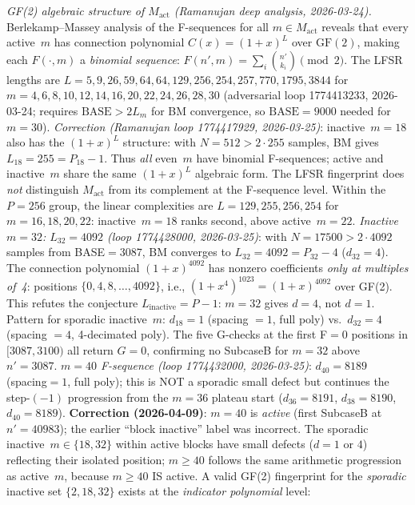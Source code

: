 \documentclass[11pt]{article}
\theoremstyle{plain}
\theoremstyle{definition}
\begin{document}
\emph{GF(2) algebraic structure of $M_{\mathrm{act}}$ (Ramanujan deep analysis, 2026-03-24).}
Berlekamp--Massey analysis of the F-sequences for all $m\in M_{\mathrm{act}}$ reveals
that every active~$m$ has connection polynomial $C(x) = (1+x)^L$ over $\mathrm{GF}(2)$,
making each $F(\cdot,m)$ a \emph{binomial sequence}: $F(n',m) = \sum_{i} \binom{n'}{k_i} \pmod{2}$.
The LFSR lengths are $L=5,9,26,59,64,64,129,256,254,257,770,1795,3844$ for
$m=4,6,8,10,12,14,16,20,22,24,26,28,30$ (adversarial loop 1774413233, 2026-03-24;
requires $\mathrm{BASE} > 2L_m$ for BM convergence, so $\mathrm{BASE}=9000$ needed for $m=30$).
\emph{Correction (Ramanujan loop 1774417929, 2026-03-25)}: inactive~$m=18$ also
has the $(1+x)^L$ structure: with $N=512>2\cdot 255$ samples, BM gives $L_{18}=255=P_{18}-1$.
Thus \emph{all} even~$m$ have binomial F-sequences; active and inactive~$m$ share
the same $(1+x)^L$ algebraic form.  The LFSR fingerprint does \emph{not} distinguish
$M_{\mathrm{act}}$ from its complement at the F-sequence level.
Within the $P=256$ group, the linear complexities are $L=129,255,256,254$ for $m=16,18,20,22$:
inactive~$m=18$ ranks second, above active~$m=22$.
\emph{Inactive $m=32$: $L_{32}=4092$ (loop 1774428000, 2026-03-25)}: with $N=17500>2\cdot 4092$
samples from BASE$=3087$, BM converges to $L_{32}=4092=P_{32}-4$ ($d_{32}=4$).
The connection polynomial $(1{+}x)^{4092}$ has nonzero coefficients \emph{only at multiples of~4}:
positions $\{0,4,8,\ldots,4092\}$, i.e., $(1{+}x^4)^{1023}=(1{+}x)^{4092}$ over GF(2).
This refutes the conjecture $L_{\mathrm{inactive}}=P-1$: $m=32$ gives $d=4$, not $d=1$.
Pattern for sporadic inactive~$m$: $d_{18}=1$ (spacing $=1$, full poly) vs.\
$d_{32}=4$ (spacing $=4$, 4-decimated poly). The five G-checks at the first
F$=0$ positions in $[3087, 3100)$ all return $G=0$, confirming no SubcaseB
for $m=32$ above $n'=3087$.
\emph{$m=40$ F-sequence (loop 1774432000, 2026-03-25)}: $d_{40}=8189$ (spacing$=1$, full poly);
this is NOT a sporadic small defect but continues the step-$(-1)$ progression from the
$m=36$ plateau start ($d_{36}=8191$, $d_{38}=8190$, $d_{40}=8189$).
\textbf{Correction (2026-04-09)}: $m=40$ is \emph{active} (first SubcaseB at $n'=40983$);
the earlier ``block inactive'' label was incorrect.
The sporadic inactive~$m\in\{18,32\}$ within active blocks have small defects ($d=1$ or $4$)
reflecting their isolated position; $m\geq 40$ follows the same arithmetic progression as active~$m$,
because $m\geq 40$ IS active.
A valid GF(2) fingerprint for the \emph{sporadic} inactive set $\{2,18,32\}$ exists at the
\emph{indicator polynomial} level:
\end{document}
